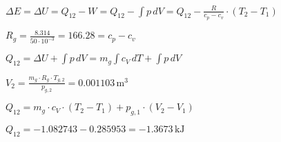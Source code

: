 \( \Delta E = \Delta U = Q_{12} - W = Q_{12} - \int p \, dV = Q_{12} - \frac{R}{c_p - c_v} \cdot (T_2 - T_1) \)  

\( R_g = \frac{8.314}{50 \cdot 10^{-3}} = 166.28 = c_p - c_v \)  

\( Q_{12} = \Delta U + \int p \, dV = m_g \int c_V \, dT + \int p \, dV \)  

\( V_2 = \frac{m_g \cdot R_g \cdot T_{g,2}}{p_{g,2}} = 0.001103 \, \text{m}^3 \)  

\( Q_{12} = m_g \cdot c_V \cdot (T_2 - T_1) + p_{g,1} \cdot (V_2 - V_1) \)  

\( Q_{12} = -1.082743 - 0.285953 = -1.3673 \, \text{kJ} \)